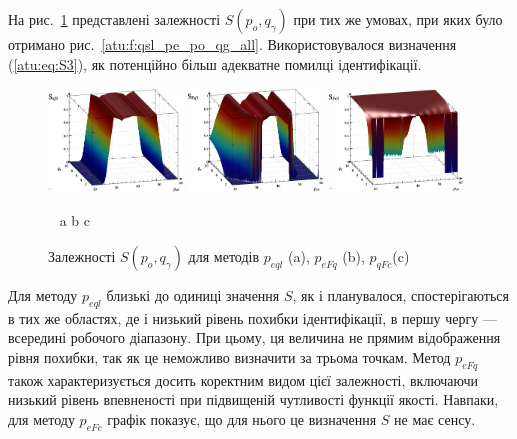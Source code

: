 \documentclass[a4paper,13pt]{atuaref}
\begin{document}
На рис.~\ref{atu:f:qsl_S_po_qg_all} представлені залежності
$S (p_o, q_\gamma)$
при тих же умовах, при яких було отримано рис.~\ref{atu:f:qsl_pe_po_qg_all}.
Використовувалося визначення (\ref{atu:eq:S3}), як
потенційно більш адекватне помилці ідентифікації.

\begin{figure}[htb!]
  \centerline{
    \includegraphics[width=0.32\textwidth]{p3/p/qls_pe-p_po_qg_Sql_all_xl.png}
    \hfill
    \includegraphics[width=0.32\textwidth]{p3/p/qls_pe-p_po_qg_SFq_all_xl.png}
    \hfill
    \includegraphics[width=0.32\textwidth]{p3/p/qls_pe-p_po_qg_SFc_all_xl.png}
  }
  \vspace{-1.5ex}
  \begin{center}
    ~ \hfill a \hfill\hfill b \hfill\hfill c \hfill ~
  \end{center}
  \vspace{-2.5ex}
  \caption{Залежності $S(p_o,q_\gamma)$ для методів $p_{eql}$ (a), $p_{eFq}$ (b), $p_{qFc}$(c)}
  \label{atu:f:qsl_S_po_qg_all}
\end{figure}

Для методу $p_{eql}$ близькі до одиниці значення $S$, як і планувалося,
спостерігаються в тих же областях, де і низький рівень похибки ідентифікації, в
першу чергу --- всередині робочого діапазону. При цьому, ця величина не
прямим відображення рівня похибки, так як це неможливо визначити за трьома точкам.
Метод $p_{eFq}$ також характеризується досить коректним видом цієї залежності,
включаючи низький рівень впевненості при підвищеній чутливості функції якості.
Навпаки, для методу $p_{eFc}$ графік показує, що для нього це визначення $ S$ не має сенсу.
\end{document}
